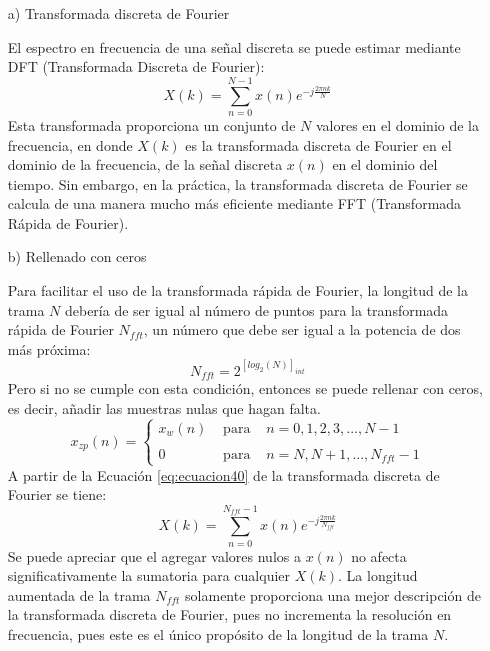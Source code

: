 \begin{enumerate}
\item[a)]Transformada discreta de Fourier
\par
El espectro en frecuencia de una señal discreta se puede estimar mediante DFT (Transformada Discreta de Fourier):
\begin{equation}
\label{eq:ecuacion40}
X(k) = \sum_{n=0}^{N-1}x(n)e^{-j\frac{2\pi nk}{N}}
\end{equation}
Esta transformada proporciona un conjunto de $N$ valores en el dominio de la frecuencia, en donde $X(k)$ es la transformada discreta de Fourier en el dominio de la frecuencia, de la señal discreta $x(n)$ en el dominio del tiempo. Sin embargo, en la práctica, la transformada discreta de Fourier se calcula de una manera mucho más eficiente mediante FFT (Transformada Rápida de Fourier).

\item[b)]Rellenado con ceros
\par
Para facilitar el uso de la transformada rápida de Fourier, la longitud de la trama $N$ debería de ser igual al número de puntos para la transformada rápida de Fourier $N_{fft}$, un número que debe ser igual a la potencia de dos más próxima:
\begin{equation}
\label{eq:ecuacion41}
N_{fft} = 2^{[log_{2}(N)]_{int}}
\end{equation}
Pero si no se cumple con esta condición, entonces se puede rellenar con ceros, es decir, añadir las muestras nulas que hagan falta.
\vskip 0.5cm
\begin{equation}
\label{eq:ecuacion42}
x_{zp}(n)= \left\{ \begin{array}{lcl}
x_{w}(n) & \mbox{ para } & n = 0,1,2,3,...,N-1 \\
& & \\
0 & \mbox{ para } & n = N,N+1,...,N_{fft} - 1
\end{array}
\right.
\end{equation}
\vskip 0.5cm
A partir de la Ecuación \eqref{eq:ecuacion40} de la transformada discreta de Fourier se tiene:
\begin{equation}
\label{eq:ecuacion43}
X(k) = \sum_{n=0}^{N_{fft}-1}x(n)e^{-j\frac{2\pi nk}{N_{fft}}}
\end{equation}
Se puede apreciar que el agregar valores nulos a $x(n)$ no afecta significativamente la sumatoria para cualquier $X(k)$. La longitud aumentada de la trama $N_{fft}$ solamente proporciona una mejor descripción de la transformada discreta de Fourier, pues no incrementa la resolución en frecuencia, pues este es el único propósito de la longitud de la trama $N$.


\end{enumerate}

